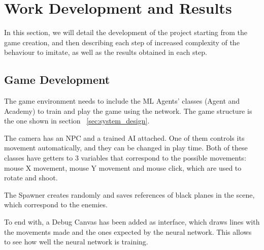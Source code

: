 %
%
%

\chapter{Work Development and Results}

\minitoc{}

\bigskip{}

In this section, we will detail the development of the project starting from the game creation, and then describing each step of increased complexity of the behaviour to imitate, as well as the results obtained in each step.

\section{Game Development}

The game environment needs to include the ML Agents' classes (Agent and Academy) to train and play the game using the network. The game structure is the one shown in section ~\ref{sec:system_design}.

The camera has an NPC and a trained AI attached. One of them controls its movement automatically, and they can be changed in play time. Both of these classes have getters to 3 variables that correspond to the possible movements: mouse X movement, mouse Y movement and mouse click, which are used to rotate and shoot.

The Spawner creates randomly and saves references of black planes in the scene, which correspond to the enemies.

To end with, a Debug Canvas has been added as interface, which draws lines with the movements made and the ones expected by the neural network. This allows to see how well the neural network is training.

